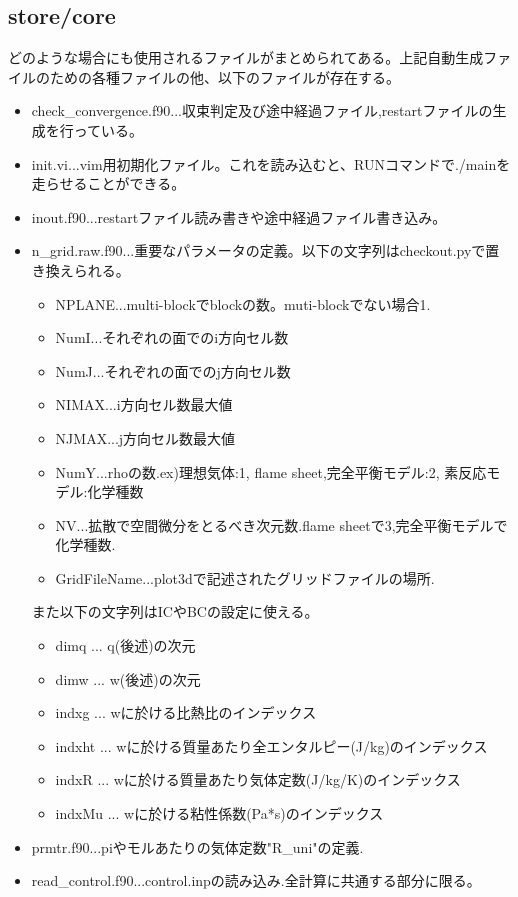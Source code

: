 \documentclass{jsarticle}
\begin{document}
\subsection{store/core}%
どのような場合にも使用されるファイルがまとめられてある。上記自動生成ファイルのための各種ファイルの他、以下のファイルが存在する。
\begin{itemize}
\item check\_convergence.f90...収束判定及び途中経過ファイル,restartファイルの生成を行っている。
\item init.vi...vim用初期化ファイル。これを読み込むと、RUNコマンドで./mainを走らせることができる。
\item inout.f90...restartファイル読み書きや途中経過ファイル書き込み。
\item n\_grid.raw.f90...重要なパラメータの定義。以下の文字列はcheckout.pyで置き換えられる。
\begin{itemize}
\item NPLANE...multi-blockでblockの数。muti-blockでない場合1.
\item NumI...それぞれの面でのi方向セル数
\item NumJ...それぞれの面でのj方向セル数
\item NIMAX...i方向セル数最大値
\item NJMAX...j方向セル数最大値
\item NumY...rhoの数.ex)理想気体:1, flame sheet,完全平衡モデル:2, 素反応モデル:化学種数
\item NV...拡散で空間微分をとるべき次元数.flame sheetで3,完全平衡モデルで化学種数.
\item GridFileName...plot3dで記述されたグリッドファイルの場所.
\end{itemize}
また以下の文字列はICやBCの設定に使える。
\begin{itemize}
\item dimq ... q(後述)の次元
\item dimw ... w(後述)の次元
\item indxg ... wに於ける比熱比のインデックス
\item indxht ... wに於ける質量あたり全エンタルピー(J/kg)のインデックス
\item indxR ... wに於ける質量あたり気体定数(J/kg/K)のインデックス
\item indxMu ... wに於ける粘性係数(Pa*s)のインデックス
\end{itemize}
\item prmtr.f90...piやモルあたりの気体定数"R\_uni"の定義.
\item read\_control.f90...control.inpの読み込み.全計算に共通する部分に限る。

\end{itemize}
\end{document}
